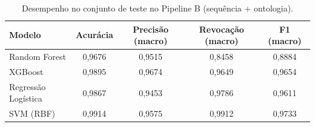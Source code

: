 \begin{table}[htbp]
  \centering
  \caption{Desempenho no conjunto de teste no Pipeline B (sequência + ontologia).}
  \label{tab:pipeline_b}
  \begin{tabular}{lcccc}
    \toprule
    Modelo & Acurácia & Precisão (macro) & Revocação (macro) & F1 (macro) \\
    \midrule
    Random Forest & 0,9676 & 0,9515 & 0,8458 & 0,8884 \\
    XGBoost & 0,9895 & 0,9674 & 0,9649 & 0,9654 \\
    Regressão Logística & 0,9867 & 0,9453 & 0,9786 & 0,9611 \\
    SVM (RBF) & 0,9914 & 0,9575 & 0,9912 & 0,9733 \\
    \bottomrule
  \end{tabular}
\end{table}
